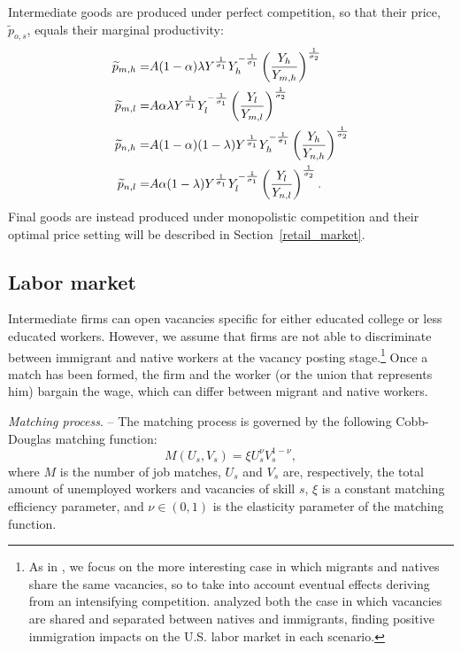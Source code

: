 \documentclass[a4paper,12pt]{article}
\begin{document}
Intermediate goods are produced under perfect competition, so that their price, $\widetilde{p}_{o,s}$,
equals their marginal productivity: 
\begin{align}
\widetilde{p}_{m,h}=&A(1-\alpha) \lambda Y^{\frac{1}{\sigma _1}} Y_h^{{-}\frac{1}{\sigma_1}%
} \left(\frac{Y_h}{Y_{m,h}} \right)^\frac{1}{\sigma_2} \label{pmh}\\
\widetilde{p}_{m,l}=&A\alpha \lambda Y^{\frac{1}{\sigma _1}} Y_l^{{-}\frac{1}{\sigma_1}}
\left(\frac{Y_l}{Y_{m,l}} \right)^\frac{1}{\sigma_2} \label{pml}\\
\widetilde{p}_{n,h}=&A(1-\alpha) (1-\lambda) Y^{\frac{1}{\sigma _1}} Y_h^{{-}\frac{1}{%
\sigma_1}} \left(\frac{Y_h}{Y_{n,h}} \right)^\frac{1}{\sigma_2} \label{pnh}\\
\widetilde{p}_{n,l}=&A\alpha (1-\lambda) Y^{\frac{1}{\sigma _1}} Y_l^{{-}\frac{1}{\sigma_1}}
\left(\frac{Y_l}{Y_{n,l}} \right)^\frac{1}{\sigma_2}.\label{pnl}
\end{align}
Final goods are instead produced under monopolistic competition and their
optimal price setting will be described in Section~\ref{retail_market}.

\subsection{Labor market} \label{labor_market}

Intermediate firms can open vacancies specific for either educated college
or less educated workers. However, we assume that firms are not able to
discriminate between immigrant and native workers at the vacancy posting
stage.\footnote{%
As in \citet{Battisti2018}, we focus on the more interesting case in
which migrants and natives share the same vacancies, so to take into account
eventual effects deriving from an intensifying competition. \citet{Chassamboulli2014} analyzed both the case in which vacancies are shared
and separated between natives and immigrants, finding positive immigration
impacts on the U.S. labor market in each scenario.} Once a match has been
formed, the firm and the worker (or the union that represents him) bargain
the wage, which can differ between migrant and native workers.


\emph{Matching process}. -- The matching process is governed by the following Cobb-Douglas matching
function: 
\begin{equation}
M(U_s,V_s)=\xi U_s^\nu V_s^{1-\nu},
\end{equation}
where $M$ is the number of job matches, $U_s$ and $V_s$ are, respectively,
the total amount of unemployed workers and vacancies of skill $s$, $\xi$ is
a constant matching efficiency parameter, and $\nu \in (0,1)$ is the
elasticity parameter of the matching function.
\end{document}
